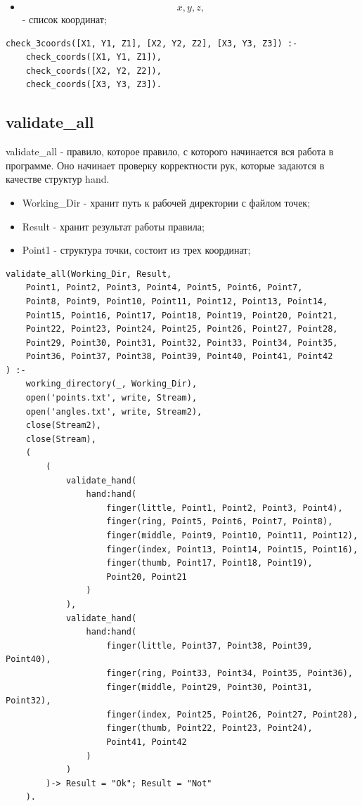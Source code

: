 \begin{itemize}
	\item \[x,y,z,\] - список координат;
\end{itemize}

\begin{lstlisting}[caption=Реализация правила check\_3coords, label=rules:check3coords]
check_3coords([X1, Y1, Z1], [X2, Y2, Z2], [X3, Y3, Z3]) :-
	check_coords([X1, Y1, Z1]),
	check_coords([X2, Y2, Z2]),
	check_coords([X3, Y3, Z3]).
\end{lstlisting}

\subsection{validate\_all}
\hspace{0.6cm} validate\_all - правило, которое правило, с которого начинается вся работа в программе. Оно начинает проверку корректности рук, которые задаются в качестве структур hand.

\begin{itemize}
	\item Working\_Dir - хранит путь к рабочей директории с файлом точек;
	\item Result - хранит результат работы правила;
	\item Point1 - структура точки, состоит из трех координат;
\end{itemize}

\begin{lstlisting}[caption=Реализация правила validate\_all, label=rules:validateall]
validate_all(Working_Dir, Result,
	Point1, Point2, Point3, Point4, Point5, Point6, Point7,
	Point8, Point9, Point10, Point11, Point12, Point13, Point14,
	Point15, Point16, Point17, Point18, Point19, Point20, Point21,
	Point22, Point23, Point24, Point25, Point26, Point27, Point28,
	Point29, Point30, Point31, Point32, Point33, Point34, Point35,
	Point36, Point37, Point38, Point39, Point40, Point41, Point42
) :-
	working_directory(_, Working_Dir),
	open('points.txt', write, Stream),
	open('angles.txt', write, Stream2),
	close(Stream2),
	close(Stream),
	(	
		(
			validate_hand(
				hand:hand(
					finger(little, Point1, Point2, Point3, Point4),
					finger(ring, Point5, Point6, Point7, Point8),
					finger(middle, Point9, Point10, Point11, Point12),
					finger(index, Point13, Point14, Point15, Point16),
					finger(thumb, Point17, Point18, Point19),
					Point20, Point21
				)
			),
			validate_hand(
				hand:hand(
					finger(little, Point37, Point38, Point39, Point40),
					finger(ring, Point33, Point34, Point35, Point36),
					finger(middle, Point29, Point30, Point31, Point32),
					finger(index, Point25, Point26, Point27, Point28),
					finger(thumb, Point22, Point23, Point24),
					Point41, Point42
				)
			)
		)-> Result = "Ok"; Result = "Not"
	).
\end{lstlisting}

